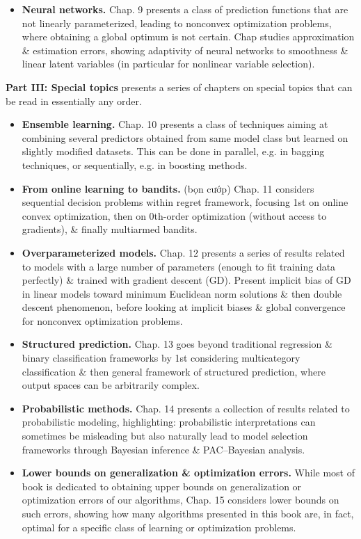 \documentclass{article}
\begin{document}
\begin{enumerate}
\begin{itemize}
\begin{itemize}
\begin{itemize}
				\item {\bf Neural networks.} Chap. 9 presents a class of prediction functions that are not linearly parameterized, leading to nonconvex optimization problems, where obtaining a global optimum is not certain. Chap studies approximation \& estimation errors, showing adaptivity of neural networks to smoothness \& linear latent variables (in particular for nonlinear variable selection).
			\end{itemize}
			{\bf Part III: Special topics} presents a series of chapters on special topics that can be read in essentially any order.
			\begin{itemize}
				\item {\bf Ensemble learning.} Chap. 10 presents a class of techniques aiming at combining several predictors obtained from same model class but learned on slightly modified datasets. This can be done in parallel, e.g. in bagging techniques, or sequentially, e.g. in boosting methods.
				\item {\bf From online learning to bandits.} (bọn cướp) Chap. 11 considers sequential decision problems within regret framework, focusing 1st on online convex optimization, then on 0th-order optimization (without access to gradients), \& finally multiarmed bandits.
				\item {\bf Overparameterized models.} Chap. 12 presents a series of results related to models with a large number of parameters (enough to fit training data perfectly) \& trained with gradient descent (GD). Present implicit bias of GD in linear models toward minimum Euclidean norm solutions \& then double descent phenomenon, before looking at implicit biases \& global convergence for nonconvex optimization problems.
				\item {\bf Structured prediction.} Chap. 13 goes beyond traditional regression \& binary classification frameworks by 1st considering multicategory classification \& then general framework of structured prediction, where output spaces can be arbitrarily complex.
				\item {\bf Probabilistic methods.} Chap. 14 presents a collection of results related to probabilistic modeling, highlighting: probabilistic interpretations can sometimes be misleading but also naturally lead to model selection frameworks through Bayesian inference \& PAC--Bayesian analysis.
				\item {\bf Lower bounds on generalization \& optimization errors.} While most of book is dedicated to obtaining upper bounds on generalization or optimization errors of our algorithms, Chap. 15 considers lower bounds on such errors, showing how many algorithms presented in this book are, in fact, optimal for a specific class of learning or optimization problems.

\end{itemize}
\end{itemize}
\end{itemize}
\end{enumerate}
\end{document}
